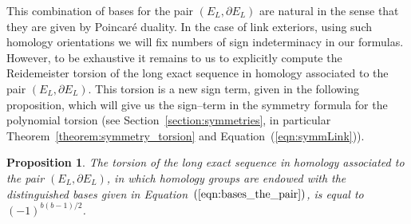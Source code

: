 \documentclass[a4paper]{amsart}
\theoremstyle{plain}
\newtheorem{proposition}[theorem]{Proposition}%
\theoremstyle{definition}
\theoremstyle{remark}
\newcommand{\bord}{\partial}
\begin{document}
This combination of bases for the pair $(E_L, \bord E_L)$ are natural in
the sense that they are given by Poincar\'e duality. In the case of
link exteriors, using such homology orientations we will fix numbers
of sign indeterminacy in our formulas. However, to be exhaustive it
remains to us to explicitly compute the Reidemeister torsion of the
long exact sequence in homology associated to the pair $(E_L, \bord E_L)$. 
This torsion is a new sign term, given in the following
proposition, which will give us the sign--term in the symmetry
formula for the polynomial torsion (see
Section~\ref{section:symmetries}, in particular
Theorem~\ref{theorem:symmetry_torsion} and Equation~(\ref{eqn:symmLink})).

\begin{proposition}\label{prop:sign_pair_link_exterior}
  The torsion of the long exact sequence in homology associated to the
  pair $(E_L, \bord E_L)$, in which homology groups are endowed with the
  distinguished bases given in Equation~$(\ref{eqn:bases_the_pair})$, is
  equal to $(-1)^{b(b-1)/2}$.
\end{proposition}
\end{document}
